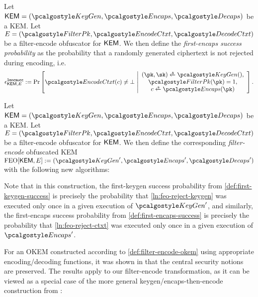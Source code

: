 \begin{definition}
\label{def:first-encaps-success}
    Let $\KEM = (\kgen, \encaps, \decaps)$ be a KEM.
    Let $E = (\filterpk, \encodectxt, \decodectxt)$ be a filter-encode obfuscator for $\mathsf{KEM}$.
    We then define the \emph{first-encaps success probability} as the probability that a randomly generated ciphertext is not rejected during encoding, i.e.
    \[
        \epsilon^\firstencapssuccess_{\KEM,E} :=
        \Pr\left[
            \encodectxt(c) \neq \bot
        ~\middle|
            \begin{array}{c}
                (\pk, \sk) \getsr \kgen(), \\
                \filterpk(\pk) = 1, \\
                c \getsr \encaps(\pk)
            \end{array}
        \right].
    \]
\end{definition}

\begin{definition}
\label{def:filter-encode-okem}
    Let $\KEM = (\kgen, \encaps, \decaps)$ be a KEM.
    Let $E = (\filterpk, \encodectxt, \decodectxt)$ be a filter-encode obfuscator for $\mathsf{KEM}$.
    We then define the corresponding \emph{filter-encode} obfuscated KEM $\feo[\KEM, E] := (\kgen', \encaps', \decaps')$ with the following new algorithms:

    
\end{definition}

Note that in this construction, the first-keygen success probability from \cref{def:first-keygen-success} is precisely the probability that \cref{ln:feo-reject-keygen} was executed only once in a given execution of $\kgen'$, and similarly, the first-encaps success probability from \cref{def:first-encaps-success} is precisely the probability that \cref{ln:feo-reject-ctxt} was executed only once in a given execution of $\encaps'$.

For an OKEM constructed according to \cref{def:filter-encode-okem} using appropriate encoding/decoding functions, it was shown in \cite[Theorems 2.12 and 2.13]{CCS:GunSteVei24} that the central security notions are preserved. The results apply to our filter-encode transformation, as it can be viewed as a special case of the more general keygen/encaps-then-encode construction from \cite{CCS:GunSteVei24}:

